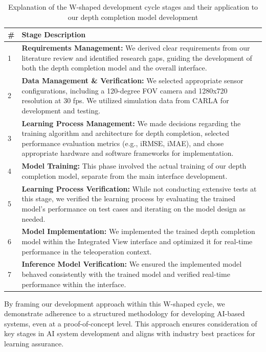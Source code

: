 \begin{table}[h!]
    \centering
    \begin{tabular}{@{}p{1cm}p{13cm}@{}}
    \toprule
    \textbf{\#} & \textbf{Stage Description} \\
    \midrule
    1 & \textbf{Requirements Management:} We derived clear requirements from our literature review and identified research gaps, guiding the development of both the depth completion model and the overall interface. \\
    \midrule
    2 & \textbf{Data Management \& Verification:} We selected appropriate sensor configurations, including a 120-degree FOV camera and 1280x720 resolution at 30 fps. We utilized simulation data from CARLA for development and testing. \\
    \midrule
    3 & \textbf{Learning Process Management:} We made decisions regarding the training algorithm and architecture for depth completion, selected performance evaluation metrics (e.g., \ac{iRMSE}, \ac{iMAE}), and chose appropriate hardware and software frameworks for implementation. \\
    \midrule
    4 & \textbf{Model Training:} This phase involved the actual training of our depth completion model, separate from the main interface development. \\
    \midrule
    5 & \textbf{Learning Process Verification:} While not conducting extensive tests at this stage, we verified the learning process by evaluating the trained model's performance on test cases and iterating on the model design as needed. \\
    \midrule
    6 & \textbf{Model Implementation:} We implemented the trained depth completion model within the Integrated View interface and optimized it for real-time performance in the teleoperation context. \\
    \midrule
    7 & \textbf{Inference Model Verification:} We ensured the implemented model behaved consistently with the trained model and verified real-time performance within the interface. \\
    \bottomrule
    \end{tabular}
    \caption{Explanation of the W-shaped development cycle stages and their application to our depth completion model development}
    \label{table:wshaped_cycle}
    \end{table}

By framing our development approach within this W-shaped cycle, we demonstrate adherence to a structured methodology for developing \ac{AI}-based systems, even at a proof-of-concept level. This approach ensures consideration of key stages in \ac{AI} system development and aligns with industry best practices for learning assurance.

